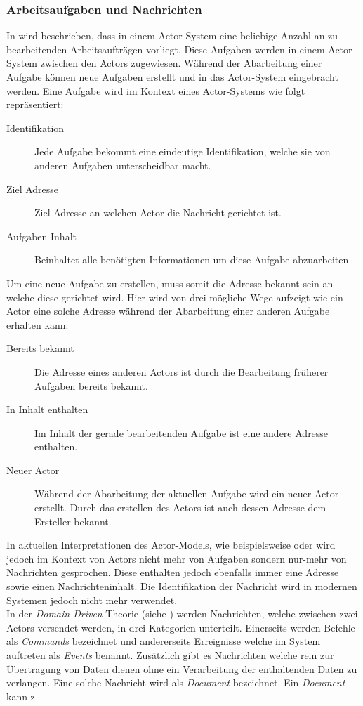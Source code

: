 \subsubsection{Arbeitsaufgaben und Nachrichten}\label{actors:messages}
In \cite{Agha1985ActorsSystems} wird beschrieben, dass in einem Actor-System eine beliebige Anzahl an zu bearbeitenden Arbeitsaufträgen vorliegt. Diese Aufgaben werden in einem Actor-System zwischen den Actors zugewiesen. Während der Abarbeitung einer Aufgabe können neue Aufgaben erstellt und in das Actor-System eingebracht werden. Eine Aufgabe wird im Kontext eines Actor-Systems wie folgt repräsentiert:
\begin{description}
    \item[Identifikation] Jede Aufgabe bekommt eine eindeutige Identifikation, welche sie von anderen Aufgaben unterscheidbar macht.
    \item[Ziel Adresse] Ziel Adresse an welchen Actor die Nachricht gerichtet ist.
    \item[Aufgaben Inhalt] Beinhaltet alle benötigten Informationen um diese Aufgabe abzuarbeiten
\end{description} 
Um eine neue Aufgabe zu erstellen, muss somit die Adresse bekannt sein an welche diese gerichtet wird. Hier wird von \cite{Agha1985ActorsSystems} drei mögliche Wege aufzeigt wie ein Actor eine solche Adresse während der Abarbeitung einer anderen Aufgabe erhalten kann.
\begin{description}
    \item[Bereits bekannt] Die Adresse eines anderen Actors ist durch die Bearbeitung früherer Aufgaben bereits bekannt.
    \item[In Inhalt enthalten] Im Inhalt der gerade bearbeitenden Aufgabe ist eine andere Adresse enthalten.
    \item[Neuer Actor] Während der Abarbeitung der aktuellen Aufgabe wird ein neuer Actor erstellt. Durch das erstellen des Actors ist auch dessen Adresse dem Ersteller bekannt.
\end{description}
In aktuellen Interpretationen des Actor-Models, wie beispielsweise \cite{Vernon2015ReactiveAkka} oder \cite{Brown2016ReactiveAkka.net.} wird jedoch im Kontext von Actors nicht mehr von Aufgaben sondern nur-mehr von Nachrichten gesprochen. Diese enthalten jedoch ebenfalls immer eine Adresse sowie einen Nachrichteninhalt. Die Identifikation der Nachricht wird in modernen Systemen jedoch nicht mehr verwendet.   \\
In der \textit{Domain-Driven}-Theorie (siehe \cite{Evans2004Domain-drivenSoftware}) werden Nachrichten, welche zwischen zwei Actors versendet werden, in drei Kategorien unterteilt. Einerseits werden Befehle als \textit{Commands} bezeichnet und andererseits Erreignisse welche im System auftreten als \textit{Events} benannt. Zusätzlich gibt es Nachrichten welche rein zur Übertragung von Daten dienen ohne ein  Verarbeitung der enthaltenden Daten zu verlangen. Eine solche Nachricht wird als \textit{Document} bezeichnet.  Ein \textit{Document} kann z\\
